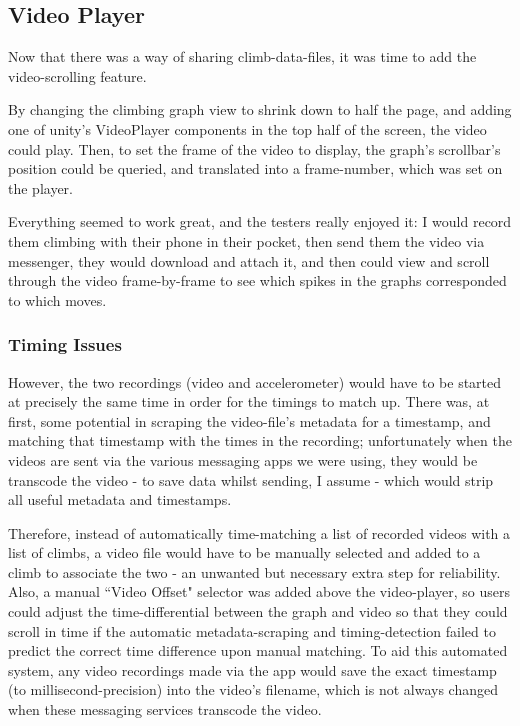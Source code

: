 \subsection{Video Player}
Now that there was a way of sharing climb-data-files, it was time to add the video-scrolling feature.

By changing the climbing graph view to shrink down to half the page, and adding one of unity's VideoPlayer components in the top half of the screen, the video could play.
Then, to set the frame of the video to display, the graph's scrollbar's position could be queried, and translated into a frame-number, which was set on the player.

Everything seemed to work great, and the testers really enjoyed it:
I would record them climbing with their phone in their pocket, then send them the video via messenger, they would download and attach it, and then could view and scroll through the video frame-by-frame to see which spikes in the graphs corresponded to which moves.

\subsubsection{Timing Issues}
However, the two recordings (video and accelerometer) would have to be started at precisely the same time in order for the timings to match up.
There was, at first, some potential in scraping the video-file's metadata for a timestamp, and matching that timestamp with the times in the recording; unfortunately when the videos are sent via the various messaging apps we were using, they would be transcode the video - to save data whilst sending, I assume - which would strip all useful metadata and timestamps.

Therefore, instead of automatically time-matching a list of recorded videos with a list of climbs, a video file would have to be manually selected and added to a climb to associate the two - an unwanted but necessary extra step for reliability.
Also, a manual ``Video Offset" selector was added above the video-player, so users could adjust the time-differential between the graph and video so that they could scroll in time if the automatic metadata-scraping and timing-detection failed to predict the correct time difference upon manual matching.
To aid this automated system, any video recordings made via the app would save the exact timestamp (to millisecond-precision) into the video's filename, which is not always changed when these messaging services transcode the video.

